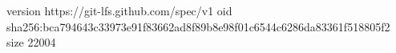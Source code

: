 version https://git-lfs.github.com/spec/v1
oid sha256:bca794643c33973e91f83662ad8f89b8e98f01c6544c6286da83361f518805f2
size 22004
